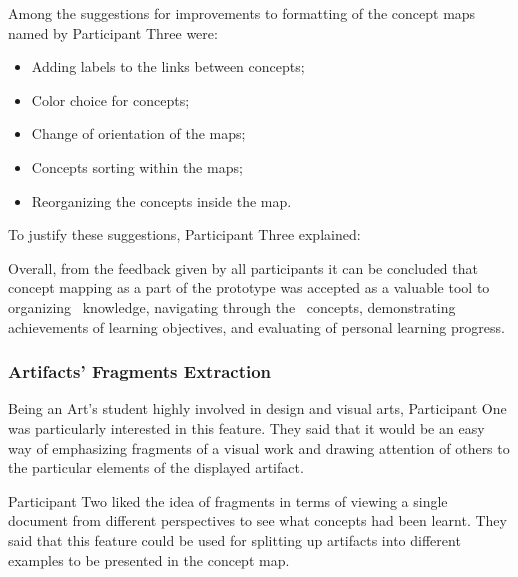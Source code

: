 
Among the suggestions for improvements to formatting of the concept maps
named by Participant Three were:
\begin{itemize}
  \item Adding labels to the links between concepts;
  \item Color choice for concepts;
  \item Change of orientation of the maps;
  \item Concepts sorting within the maps;
  \item Reorganizing the concepts inside the map.
\end{itemize}

To justify these suggestions, Participant Three explained:


Overall, from the feedback given by all participants it can be concluded that
concept mapping as a part of the prototype was accepted as a valuable tool to
organizing \ep~knowledge, navigating through the \ep~concepts, demonstrating
achievements of learning objectives, and evaluating of personal learning
progress.

\subsubsection{Artifacts' Fragments Extraction}

Being an Art's student highly involved in design and visual arts, Participant
One was particularly interested in this feature. They said that it would be an
easy way of emphasizing fragments of a visual work and drawing attention of
others to the particular elements of the displayed artifact.


Participant Two liked the idea of fragments in terms of viewing a single
document from different perspectives to see what concepts had been learnt. They
said that this feature could be used for splitting up artifacts into different
examples to be presented in the concept map.

